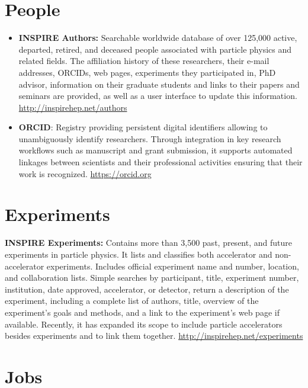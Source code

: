 \section{People}\label{databases:sec:people}

\begin{itemize}
\item
  \textbf{INSPIRE Authors:} Searchable worldwide database of over
  125,000 active, departed, retired, and deceased people associated with
  particle physics and related fields. The affiliation history of these
  researchers, their e-mail addresses, ORCIDs, web pages, experiments
  they participated in, PhD advisor, information on their graduate
  students and links to their papers and seminars are provided, as well as a user interface to update this
  information. \url{http://inspirehep.net/authors}

\item
  \textbf{ORCID}: Registry providing persistent digital identifiers
  allowing to unambiguously identify researchers. Through integration in
  key research workflows such as manuscript and grant submission, it
  supports automated linkages between scientists and their professional
  activities ensuring that their work is recognized.
  \url{https://orcid.org}
\end{itemize}

\section{Experiments}\label{databases:sec:experiments}

  \textbf{INSPIRE Experiments:} Contains more than 3,500 past, present,
  and future experiments in particle physics. It lists and classifies both accelerator and
  non-accelerator experiments. Includes official experiment name and
  number, location, and collaboration lists. Simple searches by
  participant, title, experiment number, institution, date approved,
  accelerator, or detector, return a description of the experiment,
  including a complete list of authors, title, overview of the
  experiment's goals and methods, and a link to the experiment's web
  page if available. Recently, it has expanded its scope to include
  particle accelerators besides experiments and to link them together.
  \url{http://inspirehep.net/experiments}

\section{Jobs}\label{databases:sec:jobs}

